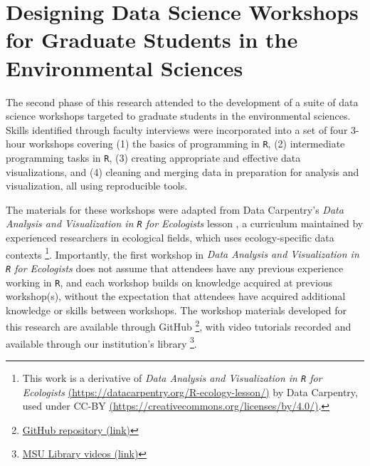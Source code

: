 \documentclass[12pt]{article}
\begin{document}

\section{Designing Data Science Workshops for Graduate Students in the 
Environmental Sciences}
\label{sec:workshops}

\quad The second phase of this research attended to the  development of a suite
of data science workshops targeted to graduate students in the environmental
sciences. Skills identified through faculty interviews were incorporated into a
set of four 3-hour workshops covering (1) the basics of programming in 
\texttt{R}, (2) intermediate programming tasks in \texttt{R}, (3) creating
appropriate and effective data visualizations, and (4) cleaning and merging data
in preparation for analysis and visualization, all using reproducible tools. 

\quad The materials for these workshops were adapted from Data Carpentry's 
\emph{Data Analysis and Visualization in \texttt{R} for Ecologists} lesson 
\citep{ecology_curriculum}, a curriculum maintained by experienced researchers
in ecological fields, which uses ecology-specific data contexts \footnote{This
work is a derivative of \emph{Data Analysis and Visualization in \texttt{R} for
Ecologists} \href{https://datacarpentry.org/R-ecology-lesson/}{(https://datacarpentry.org/R-ecology-lesson/)}
by Data Carpentry, used under CC-BY 
\href{https://creativecommons.org/licenses/by/4.0/}{(https://creativecommons.org/licenses/by/4.0/)}.}.
Importantly, the first workshop in \emph{Data Analysis and Visualization in 
\texttt{R} for Ecologists} does not assume that attendees have any previous
experience working in \texttt{R}, and each workshop builds on knowledge acquired
at previous workshop(s), without the expectation that attendees have acquired
additional knowledge or skills between workshops. The workshop materials
developed for this research are available through GitHub
\footnote{\href{https://github.com/atheobold/data-science-workshops-jse}{GitHub
repository (link)}}, with video tutorials recorded and available through our
institution's library 
\footnote{\href{http://bit.ly/ws_recordings}{MSU Library videos (link)}}.  
\end{document}
